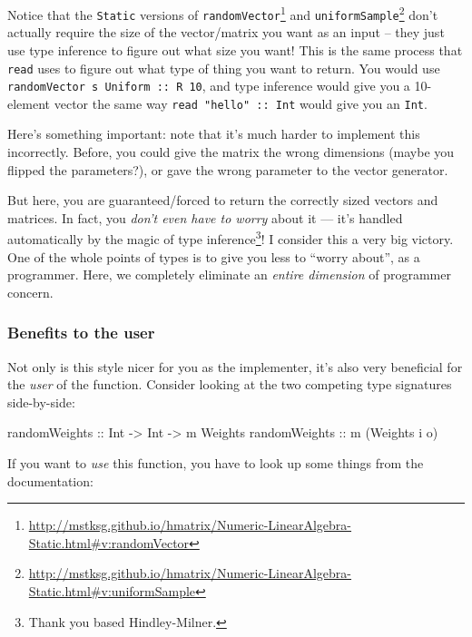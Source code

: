 \documentclass[]{article}
\newenvironment{Shaded}{}{}
\newcommand{\DataTypeTok}[1]{\textcolor[rgb]{0.56,0.13,0.00}{{#1}}}
\newcommand{\OtherTok}[1]{\textcolor[rgb]{0.00,0.44,0.13}{{#1}}}
\newcommand{\NormalTok}[1]{{#1}}
\renewcommand{\href}[2]{#2\footnote{\url{#1}}}
\begin{document}
Notice that the \texttt{Static} versions of
\href{http://mstksg.github.io/hmatrix/Numeric-LinearAlgebra-Static.html\#v:randomVector}{\texttt{randomVector}}
and
\href{http://mstksg.github.io/hmatrix/Numeric-LinearAlgebra-Static.html\#v:uniformSample}{\texttt{uniformSample}}
don't actually require the size of the vector/matrix you want as an
input -- they just use type inference to figure out what size you want!
This is the same process that \texttt{read} uses to figure out what type
of thing you want to return. You would use
\texttt{randomVector\ s\ Uniform\ ::\ R\ 10}, and type inference would
give you a 10-element vector the same way
\texttt{read\ "hello"\ ::\ Int} would give you an \texttt{Int}.

Here's something important: note that it's much harder to implement this
incorrectly. Before, you could give the matrix the wrong dimensions
(maybe you flipped the parameters?), or gave the wrong parameter to the
vector generator.

But here, you are guaranteed/forced to return the correctly sized
vectors and matrices. In fact, you \emph{don't even have to worry} about
it --- it's handled automatically by the magic of type
inference\footnote{Thank you based Hindley-Milner.}! I consider this a
very big victory. One of the whole points of types is to give you less
to ``worry about'', as a programmer. Here, we completely eliminate an
\emph{entire dimension} of programmer concern.

\subsubsection{Benefits to the user}\label{benefits-to-the-user}

Not only is this style nicer for you as the implementer, it's also very
beneficial for the \emph{user} of the function. Consider looking at the
two competing type signatures side-by-side:

\begin{Shaded}
\begin{Highlighting}[]
\OtherTok{randomWeights ::} \DataTypeTok{Int} \OtherTok{->} \DataTypeTok{Int} \OtherTok{->} \NormalTok{m }\DataTypeTok{Weights}
\OtherTok{randomWeights ::}               \NormalTok{m (}\DataTypeTok{Weights} \NormalTok{i o)}
\end{Highlighting}
\end{Shaded}

If you want to \emph{use} this function, you have to look up some things
from the documentation:
\end{document}
